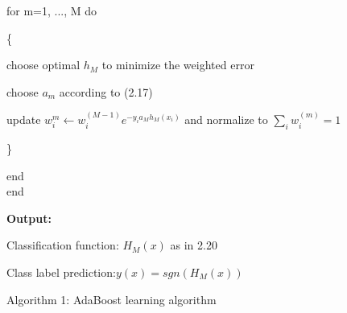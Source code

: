 \documentclass[12pt, twoside]{report}
\begin{document}
	for m=1, ..., M do \\
	\par \{
	\par choose optimal $h_M$ to minimize the weighted error \\
	\par choose $a_m$ according to (2.17) \\
	\par update $w_i^{m} \leftarrow w_i^{(M-1)}e^{-y_ia_Mh_M(x_i)}$ and normalize to $\displaystyle\sum_{i}w_i^{(m)}=1$  \\
	\par \}
	\par end \\
	end \\
	\par 
	\textbf{Output:} \\
	\par Classification function: $H_M(x)$ as in 2.20 \\
	\par Class label prediction:$y(x) = sgn(H_M(x))$

	\begin{center}
		Algorithm 1: AdaBoost learning algorithm \cite{35}
	\end{center}

	\newpage
	
\end{document}
